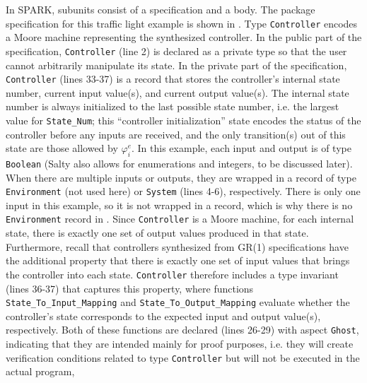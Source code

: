 \documentclass[runningheads]{llncs}
\begin{document}
In SPARK, subunits consist of a specification and a body.
The package specification for this traffic light example is shown in .
Type \lstinline{Controller} encodes a Moore machine representing the synthesized controller. 
In the public part of the specification, \lstinline{Controller} (line 2) is declared as a private type so that the user cannot arbitrarily manipulate its state.  
In the private part of the specification, \lstinline{Controller} (lines 33-37) is a record that stores the controller's internal state number, 
current input value(s), and current output value(s). 
The internal state number is always initialized to the last possible state number, i.e. the largest value for \lstinline{State_Num}; 
this ``controller initialization'' state encodes the status of the controller before any inputs are received, and the only transition(s) out of this state are those allowed by $\varphi_i^e$.
In this example, each input and output is of type \lstinline{Boolean} (Salty also allows for enumerations and integers, to be discussed later). 
When there are multiple inputs or outputs, they are wrapped in a record of type \lstinline{Environment} (not used here) or \lstinline{System} (lines 4-6), respectively. 
There is only one input in this example, so it is not wrapped in a record, which is why there is no \lstinline{Environment} record in . 
Since \lstinline{Controller} is a Moore machine, for each internal state, 
there is exactly one set of output values produced in that state. 
Furthermore, recall that controllers synthesized from GR(1) specifications have the additional property that 
there is exactly one set of input values that brings the controller into each state. 
\lstinline{Controller} therefore includes a type invariant (lines 36-37) that captures this property, 
where functions \lstinline{State_To_Input_Mapping} and \lstinline{State_To_Output_Mapping} evaluate 
whether the controller's state corresponds to the expected input and output value(s), respectively. 
Both of these functions are declared (lines 26-29) with aspect \lstinline{Ghost}, indicating that they are intended mainly for proof purposes, 
i.e. they will create verification conditions related to type \lstinline{Controller} but will not be executed in the actual program, 
\end{document}
